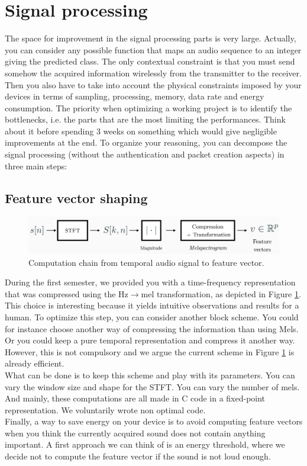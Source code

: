 \section{Signal processing}
The space for improvement in the signal processing parts is very large.
Actually, you can consider any possible function that maps an audio sequence to an integer giving the predicted class. The only contextual constraint is that you must send somehow the acquired information wirelessly from the transmitter to the receiver. Then you also have to take into account the physical constraints imposed by your devices in terms of sampling, processing, memory, data rate and energy consumption. The priority when optimizing a working project is to identify the bottlenecks, i.e. the parts that are the most limiting the performances. Think about it before spending 3 weeks on something which would give negligible improvements at the end. To organize your reasoning, you can decompose the signal processing (without the authentication and packet creation aspects) in three main steps:

\subsection{Feature vector shaping}

\begin{figure}[H]
    \centering
    \includegraphics[width=14cm]{figs/scheme.PNG}
    \caption{Computation chain from temporal audio signal to feature vector.}
    \label{fig: fv}
\end{figure}
During the first semester, we provided you with a time-frequency representation that was compressed using the Hz$\rightarrow$mel transformation, as depicted in Figure \ref{fig: fv}. This choice is interesting because it yields intuitive observations and results for a human. To optimize this step, you can consider another block scheme. You could for instance choose another way of compressing the information than using Mels. Or you could keep a pure temporal representation and compress it another way.
However, this is not compulsory and we argue the current scheme in Figure \ref{fig: fv} is already efficient. \\
What can be done is to keep this scheme and play with its parameters. You can vary the window size and shape for the STFT. You can vary the number of mels. And mainly, these computations are all made in C code in a fixed-point representation. We voluntarily wrote non optimal code. \\ 
Finally, a way to save energy on your device is to avoid computing feature vectors when you think the currently acquired sound does not contain anything important. A first approach we can think of is an energy threshold, where we decide not to compute the feature vector if the sound is not loud enough.

